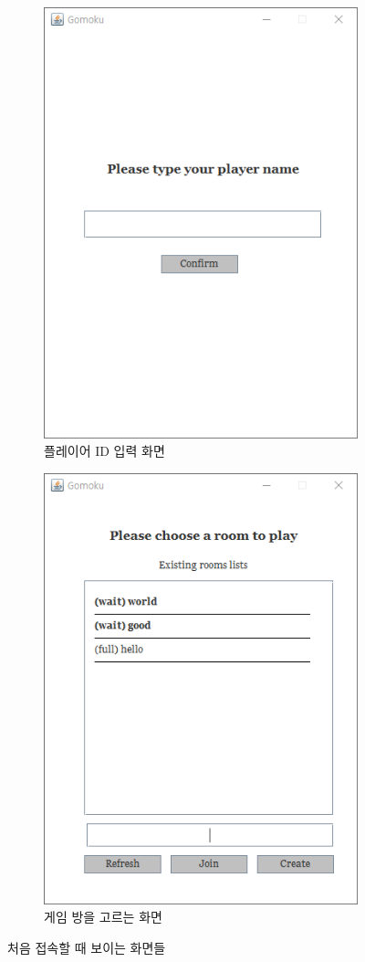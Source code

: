 \documentclass[a4paper, 10pt]{article}
\begin{document}
\begin{figure}[h]
  \centering
  \begin{subfigure}{.3\textwidth}
    \centering
    \includegraphics[width=.8\linewidth]{resource/login}
    \caption{플레이어 ID 입력 화면}
    \label{fig:login}
  \end{subfigure}
  \begin{subfigure}{.3\textwidth}
    \centering
    \includegraphics[width=.8\linewidth]{resource/room_search}
    \caption{게임 방을 고르는 화면}
    \label{fig:room_search}
  \end{subfigure}
  \caption{처음 접속할 때 보이는 화면들}
\end{figure}
\end{document}
